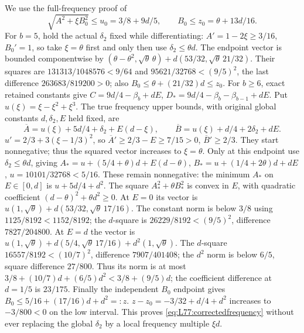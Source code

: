 We use the full-frequency proof of
\begin{equation}\tag{L77.4.1}\label{eq:L77:correctedfrequency}
\sqrt{A^2+\xi B_0^2}\le u_0=3/8+9d/5,\qquad
B_0\le z_0=\theta+13d/16.
\end{equation}
For $b=5$, hold the actual $\delta_2$ fixed while differentiating:
$A'=1-2\xi\ge3/16$, $B_0'=1$, so take $\xi=\theta$ first and
only then use $\delta_2\le\theta d$.
The endpoint vector is bounded componentwise by
$(\theta-\theta^2,\allowbreak \sqrt\theta\,\allowbreak \theta)
+d(53/32,\allowbreak \sqrt\theta\,\allowbreak 21/32)$.
Their squares are $131313/1048576<9/64$ and
$95621/32768<(9/5)^2$, the last difference
$263683/819200>0$; also $B_0\le\theta+(21/32)d\le z_0$.
For $b\ge6$, exact retained constants give
$C=9d/4-\beta_b+dE$,
$D_*=9d/4-\beta_b-\beta_{b-1}+dE$.
Put $u(\xi)=\xi-\xi^2+\xi^3$. The true frequency upper bounds,
with original global constants $d,\delta_2,E$ held fixed, are
\[
\overline A=u(\xi)+5d/4+\delta_2+E(d-\xi),\qquad
\overline B=u(\xi)+d/4+2\delta_2+dE.
\]
$u'=2/3+3(\xi-1/3)^2$, so
$\overline A'\ge2/3-E\ge7/15>0$,
$\overline B'\ge2/3$. They start nonnegative; thus the squared
vector increases to $\xi=\theta$. Only at this endpoint use
$\delta_2\le\theta d$, giving
$A_*=u+(5/4+\theta)d+E(d-\theta)$,
$B_*=u+(1/4+2\theta)d+dE$,
$u=10101/32768<5/16$.
These remain nonnegative: the minimum $A_*$ on $E\in[0,d]$ is
$u+5d/4+d^2$.
The square $A_*^2+\theta B_*^2$ is convex in $E$, with quadratic
coefficient $(d-\theta)^2+\theta d^2\ge0$.
At $E=0$ its vector is
$u(1,\allowbreak \sqrt\theta)+d(53/32,\allowbreak \sqrt\theta\,17/16)$.
The constant norm is below $3/8$ using $1125/8192<1152/8192$;
the $d$-square is $26229/8192<(9/5)^2$, difference $7827/204800$.
At $E=d$ the vector is
$u(1,\allowbreak \sqrt\theta)+d(5/4,\allowbreak \sqrt\theta\,17/16)+d^2(1,\allowbreak \sqrt\theta)$.
The $d$-square $16557/8192<(10/7)^2$, difference $7907/401408$;
the $d^2$ norm is below $6/5$, square difference $27/800$.
Thus its norm is at most
$3/8+(10/7)d+(6/5)d^2<3/8+(9/5)d$; the coefficient difference
at $d=1/5$ is $23/175$.
Finally the independent $B_0$ endpoint gives
$B_0\le5/16+(17/16)d+d^2=:z$.
$z-z_0=-3/32+d/4+d^2$ increases to $-3/800<0$ on the low interval.
This proves \eqref{eq:L77:correctedfrequency} without ever replacing
the global $\delta_2$ by a local frequency multiple $\xi d$.

